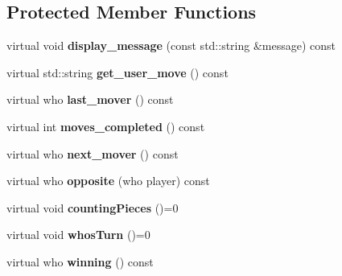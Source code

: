 \subsection*{Protected Member Functions}
\begin{DoxyCompactItemize}
\item 
\mbox{\label{classmain__savitch__14_1_1game_ac58bfc07db8e604b07d2039b2cf7ab51}} 
virtual void {\bfseries display\+\_\+message} (const std\+::string \&message) const
\item 
\mbox{\label{classmain__savitch__14_1_1game_a6504d401fcc8b138ae6342c2868c8a40}} 
virtual std\+::string {\bfseries get\+\_\+user\+\_\+move} () const
\item 
\mbox{\label{classmain__savitch__14_1_1game_a5c1ab8b36fb977bbe9fe387e793e4ee5}} 
virtual who {\bfseries last\+\_\+mover} () const
\item 
\mbox{\label{classmain__savitch__14_1_1game_a31dd5382cc6d64a6d58bcee55383cf1b}} 
virtual int {\bfseries moves\+\_\+completed} () const
\item 
\mbox{\label{classmain__savitch__14_1_1game_a4e68409618474d19742dd5f75f92f5c9}} 
virtual who {\bfseries next\+\_\+mover} () const
\item 
\mbox{\label{classmain__savitch__14_1_1game_a98469e89e13c73a5ee70407a2164888c}} 
virtual who {\bfseries opposite} (who player) const
\item 
\mbox{\label{classmain__savitch__14_1_1game_a5954eccb6abf1ae900ad853ad2af99fa}} 
virtual void {\bfseries counting\+Pieces} ()=0
\item 
\mbox{\label{classmain__savitch__14_1_1game_a98190a2bf784ce0f20533475754d136d}} 
virtual void {\bfseries whos\+Turn} ()=0
\item 
\mbox{\label{classmain__savitch__14_1_1game_a2f0d5338c12bd98d52fe2383ece5c45e}} 
virtual who {\bfseries winning} () const

\end{DoxyCompactItemize}
